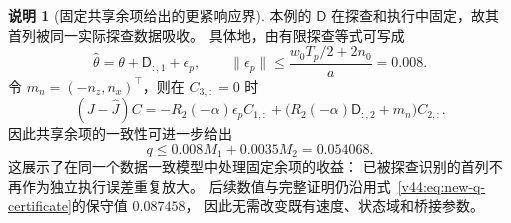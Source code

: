 \documentclass[11pt,a4paper]{article}
\numberwithin{equation}{section}
\theoremstyle{definition}
\newtheorem{remark}[theorem]{说明}
\begin{document}
\begin{remark}[固定共享余项给出的更紧响应界]
\label{v44:rem:shared-remainder-tightening}
本例的 $\mathsf D$ 在探查和执行中固定，故其首列被同一实际探查数据吸收。
具体地，由有限探查等式可写成
\begin{equation}
 \widehat\theta=\theta+\mathsf D_{:,1}+\epsilon_p,
 \qquad
 \|\epsilon_p\|\le\frac{w_0T_p/2+2n_0}{a}=0.008.
\end{equation}
令 $m_n=(-n_z,n_x)^\top$，则在 $C_{3,:}=0$ 时
\begin{equation}
 (J-\widehat J)C
 =-R_2(-\alpha)\epsilon_p C_{1,:}
   +\bigl(R_2(-\alpha)\mathsf D_{:,2}+m_n\bigr)C_{2,:}.
\end{equation}
因此共享余项的一致性可进一步给出
\begin{equation}
 q\le0.008M_1+0.0035M_2=0.054068.
 \label{v44:eq:shared-remainder-tighter-q}
\end{equation}
这展示了在同一个数据一致模型中处理固定余项的收益：
已被探查识别的首列不再作为独立执行误差重复放大。
后续数值与完整证明仍沿用式~\eqref{v44:eq:new-q-certificate}的保守值 $0.087458$，
因此无需改变既有速度、状态域和桥接参数。
\end{remark}
\end{document}
